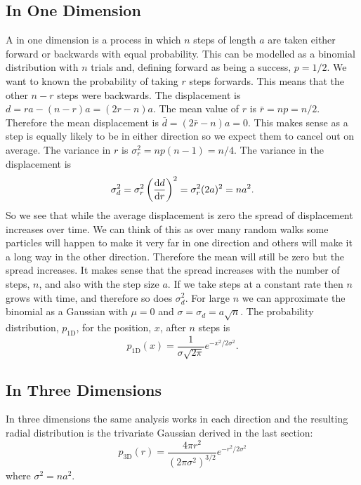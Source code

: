 \documentclass[a4paper]{article}
\begin{document}
    \subsection{In One Dimension}
    A  in one dimension is a process in which \(n\) steps of length \(a\) are taken either forward or backwards with equal probability.
    This can be modelled as a binomial distribution with \(n\) trials and, defining forward as being a success, \(p = 1/2\).
    We want to known the probability of taking \(r\) steps forwards.
    This means that the other \(n - r\) steps were backwards.
    The displacement is \(d = ra - (n - r)a = (2r - n)a\).
    The mean value of \(r\) is \(\bar{r} = np = n/2\).
    Therefore the mean displacement is \(\bar{d} = (2\bar{r} - n)a = 0\).
    This makes sense as a step is equally likely to be in either direction so we expect them to cancel out on average.
    The variance in \(r\) is \(\sigma_r^2 = np(n - 1) = n/4\).
    The variance in the displacement is
    \[\sigma_d^2 = \sigma_r^2\left(\dv{d}{r}\right)^2 = \sigma_r^2(2a)^2 = na^2.\]
    So we see that while the average displacement is zero the spread of displacement increases over time.
    We can think of this as over many random walks some particles will happen to make it very far in one direction and others will make it a long way in the other direction.
    Therefore the mean will still be zero but the spread increases.
    It makes sense that the spread increases with the number of steps, \(n\), and also with the step size \(a\).
    If we take steps at a constant rate then \(n\) grows with time, and therefore so does \(\sigma_d^2\).
    For large \(n\) we can approximate the binomial as a Gaussian with \(\mu = 0\) and \(\sigma = \sigma_d = a\sqrt{n}\).
    The probability distribution, \(p_{\mathrm{1D}}\), for the position, \(x\), after \(n\) steps is
    \[p_{\mathrm{1D}}(x) = \frac{1}{\sigma\sqrt{2\pi}}e^{-x^2/2\sigma^2}.\]
    
    \subsection{In Three Dimensions}
    In three dimensions the same analysis works in each direction and the resulting radial distribution is the trivariate Gaussian derived in the last section:
    \[p_{\mathrm{3D}}(r) = \frac{4\pi r^2}{(2\pi\sigma^2)^{3/2}}e^{-r^2/2\sigma^2}\]
    where \(\sigma^2 = na^2\).
    
\end{document}
